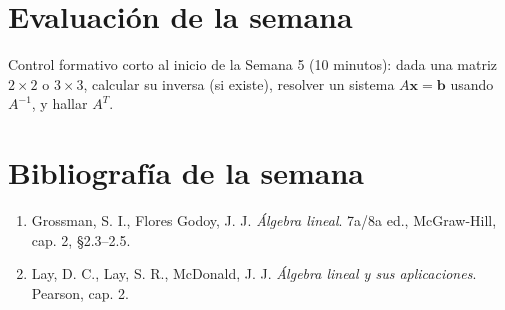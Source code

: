 \documentclass[11pt,letterpaper]{article}
\newcommand{\vv}[1]{\mathbf{#1}}
\begin{document}
\section{Evaluación de la semana}

Control formativo corto al inicio de la Semana 5 (10 minutos): dada una matriz $2\times 2$ o $3\times 3$,
calcular su inversa (si existe), resolver un sistema $A\vv{x}=\vv{b}$ usando $A^{-1}$, y hallar $A^T$.

\section{Bibliografía de la semana}

\begin{enumerate}[leftmargin=1.2cm]
  \item Grossman, S. I., Flores Godoy, J. J. \emph{Álgebra lineal}. 7a/8a ed., McGraw-Hill,
        cap. 2, §2.3--2.5.
  \item Lay, D. C., Lay, S. R., McDonald, J. J. \emph{Álgebra lineal y sus aplicaciones}. Pearson, cap. 2.
\end{enumerate}
\end{document}
